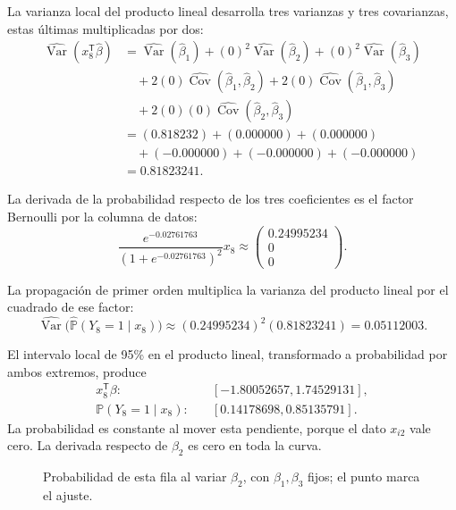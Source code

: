 \documentclass[11pt,a4paper]{article}
\newcommand{\Prob}{\mathbb P}
\newcommand{\T}{^{\mathsf T}}
\DeclareMathOperator{\Var}{Var}
\DeclareMathOperator{\Cov}{Cov}
\begin{document}
La varianza local del producto lineal desarrolla tres varianzas
y tres covarianzas, estas últimas multiplicadas por dos:
\[
\begin{aligned}
\widehat{\Var}(x_{8}\T\widehat\beta)&=\widehat{\Var}(\widehat\beta_1)+(0)^2\widehat{\Var}(\widehat\beta_2)+(0)^2\widehat{\Var}(\widehat\beta_3)\\&\quad+2(0)\widehat{\Cov}(\widehat\beta_1,\widehat\beta_2)+2(0)\widehat{\Cov}(\widehat\beta_1,\widehat\beta_3)\\&\quad+2(0)(0)\widehat{\Cov}(\widehat\beta_2,\widehat\beta_3)\\&=(0.818232)+(0.000000)+(0.000000)\\&\quad+(-0.000000)+(-0.000000)+(-0.000000)\\&=0.81823241.\end{aligned}
\]

La derivada de la probabilidad respecto de los tres coeficientes
es el factor Bernoulli por la columna de datos:
\[
\frac{e^{-0.02761763}}{(1+e^{-0.02761763})^2}x_{8}\approx\begin{pmatrix}0.24995234\\0\\0\end{pmatrix}.
\]

La propagación de primer orden multiplica la varianza del
producto lineal por el cuadrado de ese factor:
\[
\widehat{\Var}\bigl(\widehat{\Prob}(Y_{8}=1\mid x_{8})\bigr)\approx(0.24995234)^2(0.81823241)=0.05112003.
\]

El intervalo local de 95\% en el producto lineal,
transformado a probabilidad por ambos extremos, produce
\[
\begin{aligned}
x_{8}\T\beta:&\quad[-1.80052657,1.74529131],\\\Prob(Y_{8}=1\mid x_{8}):&\quad[0.14178698,0.85135791].\end{aligned}
\]
La probabilidad es constante al mover esta pendiente, porque el dato $x_{i2}$ vale cero. La derivada respecto de $\beta_2$ es cero en toda la curva.
\begin{figure}[H]\centering
{}
\caption{Probabilidad de esta fila al variar \(\beta_2\), con \(\beta_1,\beta_3\) fijos; el punto marca el ajuste.}
\end{figure}
\end{document}
